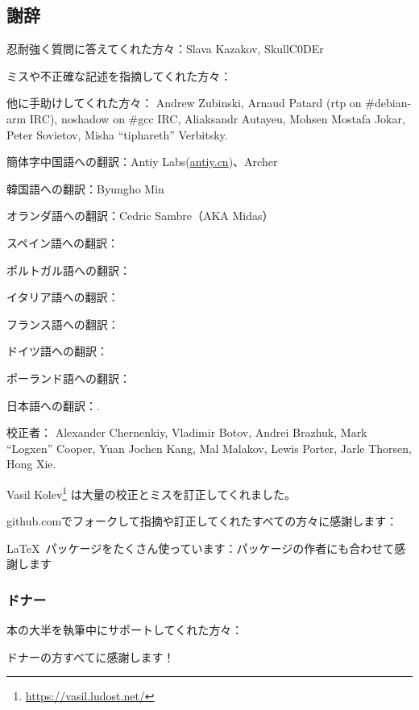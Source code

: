 \subsection*{謝辞}

忍耐強く質問に答えてくれた方々：Slava  Kazakov, SkullC0DEr

ミスや不正確な記述を指摘してくれた方々：\PeopleMistakesInaccuracies{}

他に手助けしてくれた方々：
Andrew Zubinski,
Arnaud Patard (rtp on \#debian-arm IRC),
noshadow on \#gcc IRC,
Aliaksandr Autayeu,
Mohsen Mostafa Jokar,
Peter Sovietov,
Misha ``tiphareth'' Verbitsky.

簡体字中国語への翻訳：Antiy Labs(\href{http://antiy.cn}{antiy.cn})、Archer

韓国語への翻訳：Byungho Min

オランダ語への翻訳：Cedric Sambre（AKA Midas）

スペイン語への翻訳： \PeopleSpanishTranslators{}

ポルトガル語への翻訳：\PeoplePTBRTranslators{}

イタリア語への翻訳：\PeopleItalianTranslators{}

フランス語への翻訳：\PeopleFrenchTranslators{}

ドイツ語への翻訳：\PeopleGermanTranslators{}

ポーランド語への翻訳：\PeoplePolishTranslators{}

日本語への翻訳：\PeopleJapaneseTranslators{}.

校正者：
Alexander  Chernenkiy,
Vladimir Botov,
Andrei Brazhuk,
Mark ``Logxen'' Cooper, Yuan Jochen Kang, Mal Malakov, Lewis Porter, Jarle Thorsen, Hong Xie.

Vasil Kolev\footnote{\url{https://vasil.ludost.net/}} は大量の校正とミスを訂正してくれました。

github.comでフォークして指摘や訂正してくれたすべての方々に感謝します：\FNGithubContributors{}

\LaTeX\ パッケージをたくさん使っています：パッケージの作者にも合わせて感謝します

\subsubsection*{ドナー}

本の大半を執筆中にサポートしてくれた方々：



ドナーの方すべてに感謝します！
